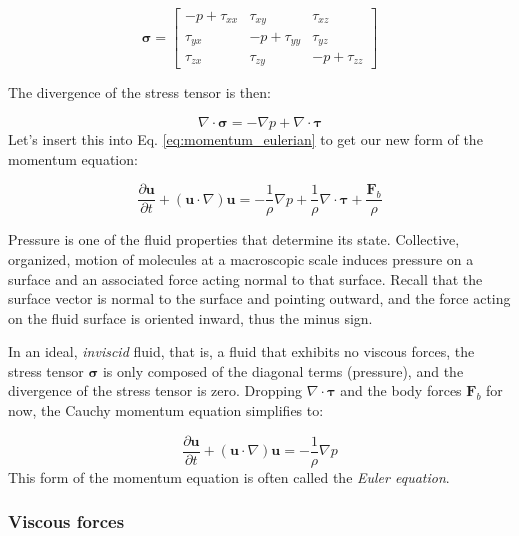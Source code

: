 \documentclass[12pt]{article}
\numberwithin{equation}{section}
\numberwithin{figure}{section}
\numberwithin{table}{section}
\begin{document}
\begin{equation}
  \boldsymbol{\sigma} = \begin{bmatrix}
    -p + \tau_{xx} & \tau_{xy} & \tau_{xz} \\
    \tau_{yx} & -p + \tau_{yy} & \tau_{yz} \\
    \tau_{zx} & \tau_{zy} & -p + \tau_{zz}
  \end{bmatrix}
\end{equation}

The divergence of the stress tensor is then:

\begin{equation}
  \nabla \cdot \boldsymbol{\sigma} = - \nabla p + \nabla \cdot \boldsymbol{\tau}
\end{equation}
Let's insert this into Eq. \ref{eq:momentum_eulerian} to get our new form of
the momentum equation:

\begin{equation}
  \frac{\partial \mathbf{u}}{\partial t} + (\mathbf{u} \cdot \nabla) \mathbf{u} =
  - \frac{1}{\rho} \nabla p + \frac{1}{\rho} \nabla \cdot \boldsymbol{\tau} + \frac{\mathbf{F}_b}{\rho}
  \label{eq:momentum_cauchy_with_shear}
\end{equation}

Pressure is one of the fluid properties that determine its state.
Collective, organized, motion of molecules at a macroscopic scale induces
pressure on a surface and an associated force acting normal to that surface.
Recall that the surface vector is normal to the surface and pointing outward,
and the force acting on the fluid surface is oriented inward, thus the minus sign.

In an ideal, \textit{inviscid} fluid, that is, a fluid that exhibits no viscous
forces, the stress tensor $\boldsymbol{\sigma}$ is only composed of the diagonal
terms (pressure), and the divergence of the stress tensor is zero.
Dropping $\nabla \cdot \boldsymbol{\tau}$ and the body forces $\mathbf{F}_b$ for
now, the Cauchy momentum equation simplifies to:

\begin{equation}
  \frac{\partial \mathbf{u}}{\partial t} + (\mathbf{u} \cdot \nabla) \mathbf{u} =
  - \frac{1}{\rho} \nabla p
  \label{eq:momentum_euler}
\end{equation}
This form of the momentum equation is often called the \textit{Euler equation}.

\subsubsection{Viscous forces}
\label{sec:viscous_forces}
\end{document}
